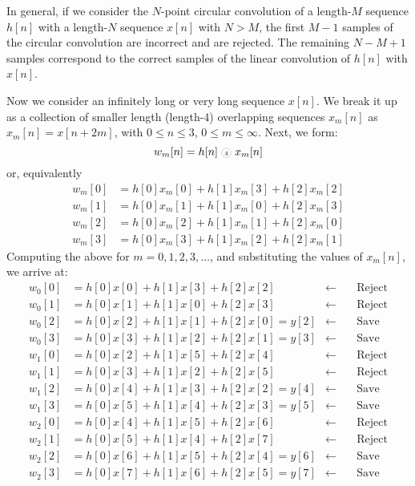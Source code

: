 \documentclass[../../main/main.tex]{subfiles}
\begin{document}
In general, if we consider the \( N \)-point circular convolution of a length-\( M \) sequence \( h[n] \) with a length-\( N \) sequence \( x[n] \) with \( N > M \), the first \( M - 1 \) samples of the circular convolution are incorrect and are rejected. The remaining \( N - M + 1 \) samples correspond to the correct samples of the linear convolution of \( h[n] \) with \( x[n] \).

Now we consider an infinitely long or very long sequence \( x[n] \). We break it up as a collection of smaller length (length-4) overlapping sequences \( x_{m}[n] \) as \( x_{m}[n] = x[n+2m] \), with \( 0 \le n \le 3 \), \( 0 \le m \le \infty \). Next, we form:
\begin{equation}
    w_{m}[n]
    =
    h[n] \circled{4} x_{m}[n]
    \label{eq:L13_S35_1}
\end{equation}
or, equivalently
\begin{align}
    w_{m}[0] &= h[0]x_{m}[0] + h[1]x_{m}[3] + h[2]x_{m}[2]  \\
    w_{m}[1] &= h[0]x_{m}[1] + h[1]x_{m}[0] + h[2]x_{m}[3]  \\
    w_{m}[2] &= h[0]x_{m}[2] + h[1]x_{m}[1] + h[2]x_{m}[0]  \\
    w_{m}[3] &= h[0]x_{m}[3] + h[1]x_{m}[2] + h[2]x_{m}[1]
\end{align}
Computing the above for \( m = 0, 1, 2, 3, \dots \), and substituting the values of \( x_{m}[n] \), we arrive at:
\begin{align*}
    w_{0}[0] &= h[0]x[0] + h[1]x[3] + h[2]x[2]          &   \leftarrow &\quad \text{Reject}    \\
    w_{0}[1] &= h[0]x[1] + h[1]x[0] + h[2]x[3]          &   \leftarrow &\quad \text{Reject}    \\
    w_{0}[2] &= h[0]x[2] + h[1]x[1] + h[2]x[0] = y[2]   &   \leftarrow &\quad \text{Save}      \\
    w_{0}[3] &= h[0]x[3] + h[1]x[2] + h[2]x[1] = y[3]   &   \leftarrow &\quad \text{Save}      \\
    w_{1}[0] &= h[0]x[2] + h[1]x[5] + h[2]x[4]          &   \leftarrow &\quad \text{Reject}    \\
    w_{1}[1] &= h[0]x[3] + h[1]x[2] + h[2]x[5]          &   \leftarrow &\quad \text{Reject}    \\
    w_{1}[2] &= h[0]x[4] + h[1]x[3] + h[2]x[2] = y[4]   &   \leftarrow &\quad \text{Save}      \\
    w_{1}[3] &= h[0]x[5] + h[1]x[4] + h[2]x[3] = y[5]   &   \leftarrow &\quad \text{Save}      \\
    w_{2}[0] &= h[0]x[4] + h[1]x[5] + h[2]x[6]          &   \leftarrow &\quad \text{Reject}    \\
    w_{2}[1] &= h[0]x[5] + h[1]x[4] + h[2]x[7]          &   \leftarrow &\quad \text{Reject}    \\
    w_{2}[2] &= h[0]x[6] + h[1]x[5] + h[2]x[4] = y[6]   &   \leftarrow &\quad \text{Save}      \\
    w_{2}[3] &= h[0]x[7] + h[1]x[6] + h[2]x[5] = y[7]   &   \leftarrow &\quad \text{Save}
\end{align*}
\end{document}

